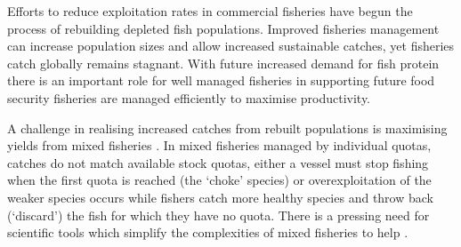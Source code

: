 \documentclass{nature}
\begin{document}
\begin{linenumbers}
 Efforts to reduce exploitation rates in commercial fisheries
have begun the process of rebuilding depleted fish populations\cite{Worm2009}.
Improved fisheries management  can increase
population sizes and allow increased sustainable catches, yet fisheries catch
globally remains stagnant\cite{FAO2016}. With future increased demand for fish
protein  there is an important role for well managed
fisheries in supporting future food security \cite{Mcclanahan2015}
   fisheries are managed efficiently to
maximise productivity.

A  challenge in realising increased catches
from rebuilt populations is maximising yields from mixed fisheries
\cite{Branch2008, Kuriyama2016, Ulrich2016}. In mixed fisheries managed by individual quotas,
 catches do not match available stock quotas,
either a vessel must stop fishing when the first quota is reached (the `choke'
species) or overexploitation of the weaker species occurs while fishers
 catch more healthy species and throw back (`discard') the
fish for which they have no quota\cite{Batsleer2015}.  There is a pressing need for scientific tools which simplify the
complexities of mixed fisheries to help . 


\end{linenumbers}
\end{document}
